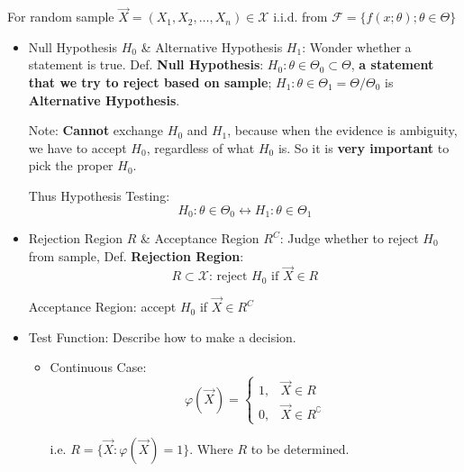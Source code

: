     For random sample $\vec{X}=(X_1,X_2,\ldots,X_n)\in\mathscr{X}$ i.i.d. from $\mathscr{F}=\{f(x;\theta);\theta\in\Theta\}$
    \begin{itemize}[topsep = -3 pt]
        \item Null Hypothesis $H_0$ \& Alternative Hypothesis $H_1$: Wonder whether a statement is true. Def. \textbf{Null Hypothesis}: $H_0:\theta\in\Theta_0\subset\Theta$, \textbf{a statement that we try to reject based on sample}; $H_1:\theta\in\Theta_1=\Theta/\Theta_0$ is \textbf{Alternative Hypothesis}.
        
\begin{point}
    Note: \textbf{Cannot} exchange $ H_0 $ and $ H_1 $, because when the evidence is ambiguity, we have to accept $ H_0 $, regardless of what $ H_0 $ is. So it is \textbf{very important} to pick the proper $ H_0 $.
\end{point}


        Thus Hypothesis Testing:
        \begin{equation}
            H_0:\theta\in\Theta_0\longleftrightarrow H_1:\theta\in\Theta_1
        \end{equation}
        
        \item Rejection Region $R$ \& Acceptance Region $R^C$: Judge whether to reject $H_0$ from sample, Def. \textbf{Rejection Region}:
        \begin{equation}R\subset\mathscr{X}\text{: reject } H_0 \text{ if } \vec{X}\in R\end{equation}

        Acceptance Region: accept $H_0$ if $\vec{X}\in R^C$
        \item Test Function: Describe how to make a decision.
        \begin{itemize}
            \item Continuous Case:
        \begin{equation}
            \varphi(\vec{X})=\begin{cases}
                1,&\vec{X}\in R\\
                0,&\vec{X}\in R^\complement
            \end{cases}
        \end{equation}

        i.e. $R=\{\vec{X}:\varphi(\vec{X})=1\}$. Where $R$ to be determined.


\end{itemize}
\end{itemize}
